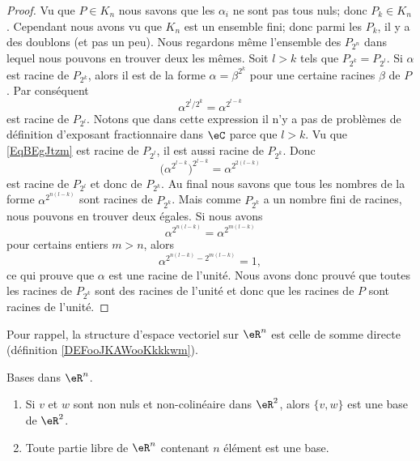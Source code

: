 \begin{proof}
	Vu que \( P\in K_n\) nous savons que les \( \alpha_i\) ne sont pas tous nuls; donc \( P_k\in K_n\). Cependant nous avons vu que \( K_n\) est un ensemble fini; donc parmi les \( P_k\), il y a des doublons (et pas un peu). Nous regardons même l'ensemble des \( P_{2^n}\) dans lequel nous pouvons en trouver deux les mêmes. Soit \( l>k\) tels que \( P_{2^k}=P_{2^l}\). Si \( \alpha\) est racine de \( P_{2^k}\), alors il est de la forme \( \alpha=\beta^{2^k}\) pour une certaine racines \( \beta\) de \( P\). Par conséquent
	\begin{equation}    \label{EqBEgJtzm}
		\alpha^{2^l/2^k}=\alpha^{2^{l-k}}
	\end{equation}
	est racine de \( P_{2^l}\). Notons que dans cette expression il n'y a pas de problèmes de définition d'exposant fractionnaire dans \( \eC\) parce que \( l>k\). Vu que \eqref{EqBEgJtzm} est racine de \( P_{2^l}\), il est aussi racine de \( P_{2^k}\). Donc
	\begin{equation}
		\big( \alpha^{2^{l-k}} \big)^{2^{l-k}}=\alpha^{2^{2(l-k)}}
	\end{equation}
	est racine de \( P_{2^l}\) et donc de \( P_{2^k}\). Au final nous savons que tous les nombres de la forme \( \alpha^{2^{n(l-k)}}\) sont racines de \( P_{2^k}\). Mais comme \( P_{2^k}\) a un nombre fini de racines, nous pouvons en trouver deux égales. Si nous avons
	\begin{equation}
		\alpha^{2^{n(l-k)}}=\alpha^{2^{m(l-k)}}
	\end{equation}
	pour certains entiers \( m>n\), alors
	\begin{equation}
		\alpha^{2^{n(l-k)}-2^{m(l-k)}}=1,
	\end{equation}
	ce qui prouve que \( \alpha\) est une racine de l'unité. Nous avons donc prouvé que toutes les racines de \( P_{2^k}\) sont des racines de l'unité et donc que les racines de \( P\) sont racines de l'unité.
\end{proof}



Pour rappel, la structure d'espace vectoriel sur \( \eR^n\) est celle de somme directe (définition \ref{DEFooJKAWooKkkkwm}).
\begin{lemma}        \label{LEMooRWQHooIxrQek}
	Bases dans \( \eR^n\).
	\begin{enumerate}
		\item       \label{ITEMooKWULooCTmOqM}
		      Si \( v\) et \( w\) sont non nuls et non-colinéaire dans \( \eR^2\), alors \( \{ v,w \}\) est une base de \( \eR^2\).
		\item		\label{ITEMooKMRVooRiKZqN}
		      Toute partie libre de \( \eR^n\) contenant \( n\) élément est une base.
	\end{enumerate}
\end{lemma}

